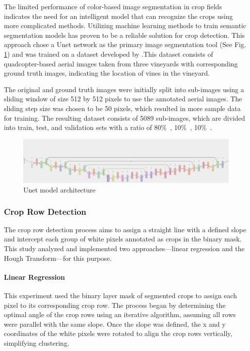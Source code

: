 \documentclass[conference]{IEEEtran}
\begin{document}
	The limited performance of color-based image segmentation in crop fields indicates the need for an intelligent model that can recognize the crops using more complicated methods. Utilizing machine learning methods to train semantic segmentation models has proven to be a reliable solution for crop detection. This approach chose a Unet network as the primary image segmentation tool (See Fig.
	\ref{fig_Unet})
	and was trained on a dataset developed by
	\cite{b5}
	.This dataset consists of quadcopter-based aerial images taken from three vineyards with corresponding ground truth images, indicating the location of vines in the vineyard.
	
	The original and ground truth images were initially split into sub-images using a sliding window of size 512 by 512 pixels to use the annotated aerial images. The sliding step size was chosen to be 50 pixels, which resulted in more sample data for training. The resulting dataset consists of 5089 sub-images, which are divided into train, test, and validation sets with a ratio of 80\%\
	, 10\%\
	, 10\%\
	.
	
	
	\begin{figure}[t]
		\includegraphics[width=\linewidth]{UNET.png}
		\caption{Unet model architecture}
		\label{fig_Unet}
	\end{figure}
	
	\subsubsection{Crop Row Detection}\label{Crop Row Detection}\leavevmode
	
	The crop row detection process aims to assign a straight line with a defined slope and intercept each group of white pixels annotated as crops in the binary mask. This study analyzed and implemented two approaches—linear regression and the Hough Transform—for this purpose.
	
	\paragraph{Linear Regression}\label{Linear Regression}\leavevmode
	
	This experiment used the binary layer mask of segmented crops to assign each pixel to its corresponding crop row. The process began by determining the optimal angle of the crop rows using an iterative algorithm, assuming all rows were parallel with the same slope. Once the slope was defined, the x and y coordinates of the white pixels were rotated to align the crop rows vertically, simplifying clustering.
	
\end{document}
